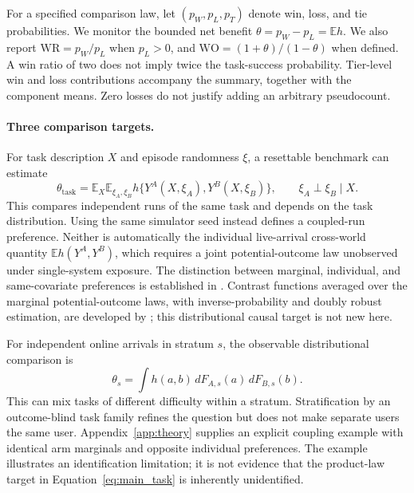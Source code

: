 \documentclass{article}
\newcommand{\E}{\mathbb E}
\begin{document}
For a specified comparison law, let $(p_W,p_L,p_T)$ denote win, loss, and
tie probabilities. We monitor the bounded net benefit
$\theta=p_W-p_L=\E h$. We also report $\mathrm{WR}=p_W/p_L$ when $p_L>0$,
and $\mathrm{WO}=(1+\theta)/(1-\theta)$ when defined. A win ratio of two
does not imply twice the task-success probability. Tier-level win and
loss contributions accompany the summary, together with the component
means. Zero losses do not justify adding an arbitrary pseudocount.

\paragraph{Three comparison targets.}
For task description $X$ and episode randomness $\xi$, a resettable
benchmark can estimate
\begin{equation}
 \theta_{\mathrm{task}}=\E_X\E_{\xi_A,\xi_B}
 h\{Y^A(X,\xi_A),Y^B(X,\xi_B)\},\qquad
 \xi_A\perp\xi_B\mid X.
 \label{eq:main_task}
\end{equation}
This compares independent runs of the same task and depends on the task
distribution. Using the same simulator seed instead defines a coupled-run
preference. Neither is automatically the individual live-arrival
cross-world quantity $\E h(Y^A,Y^B)$, which requires a joint
potential-outcome law unobserved under single-system exposure.
The distinction between marginal, individual, and same-covariate
preferences is established in \citet{even2025rethinking}.
Contrast functions averaged over the marginal potential-outcome laws,
with inverse-probability and doubly robust estimation, are developed by
\citet{mao2018causal}; this distributional causal target is not new here.

For independent online arrivals in stratum $s$, the observable
distributional comparison is
\begin{equation}
 \theta_s=\int h(a,b)\,dF_{A,s}(a)\,dF_{B,s}(b).
 \label{eq:main_online}
\end{equation}
This can mix tasks of different difficulty within a stratum. Stratification
by an outcome-blind task family refines the question but does not make
separate users the same user. Appendix~\ref{app:theory} supplies an explicit
coupling example with identical arm marginals and opposite individual
preferences. The example illustrates an identification limitation; it is
not evidence that the product-law target in
Equation~\eqref{eq:main_task} is inherently unidentified.
\end{document}
